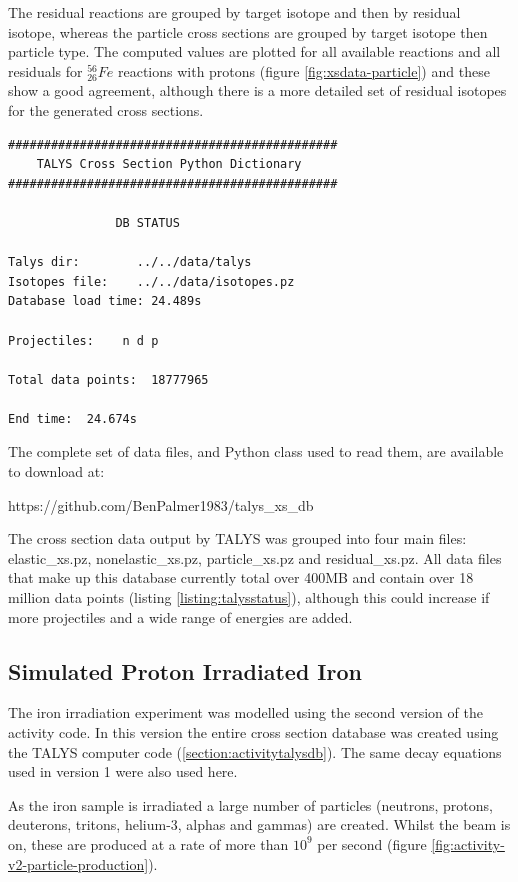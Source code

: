 The residual reactions are grouped by target isotope and then by residual isotope, whereas the particle cross sections are grouped by target isotope then particle type.  The computed values are plotted for all available reactions and all residuals for ${}^{56}_{26}Fe$ reactions with protons (figure \ref{fig:xsdata-particle}) and these show a good agreement, although there is a more detailed set of residual isotopes for the generated cross sections.

\begin{lstlisting}[style=sOutputFile,caption={Status report from TALYS database code},label={listing:talysstatus}]
##############################################
    TALYS Cross Section Python Dictionary     
##############################################

               DB STATUS                      

Talys dir:        ../../data/talys
Isotopes file:    ../../data/isotopes.pz
Database load time: 24.489s

Projectiles:    n d p 

Total data points:  18777965

End time:  24.674s
\end{lstlisting}

The complete set of data files, and Python class used to read them, are available to download at:

https://github.com/BenPalmer1983/talys\_xs\_db 

The cross section data output by TALYS was grouped into four main files: elastic\_xs.pz, nonelastic\_xs.pz, particle\_xs.pz and residual\_xs.pz.  All data files that make up this database currently total over 400MB and contain over 18 million data points (listing \ref{listing:talysstatus}), although this could increase if more projectiles and a wide range of energies are added.

\subsection{Simulated Proton Irradiated Iron}

The iron irradiation experiment was modelled using the second version of the activity code.  In this version the entire cross section database was created using the TALYS computer code (\ref{section:activitytalysdb}).  The same decay equations used in version 1 were also used here.

As the iron sample is irradiated a large number of particles (neutrons, protons, deuterons, tritons, helium-3, alphas and gammas) are created.  Whilst the beam is on, these are produced at a rate of more than $10^9$ per second (figure \ref{fig:activity-v2-particle-production}).

